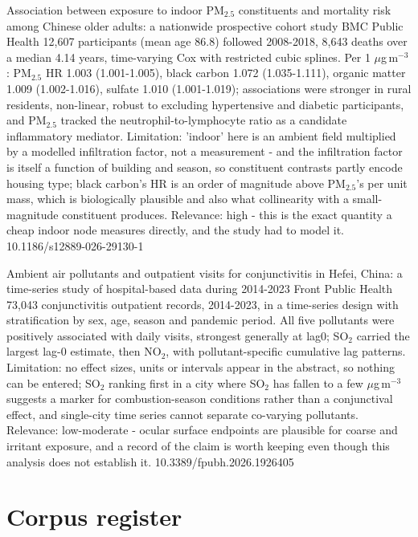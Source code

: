 \documentclass[10pt]{article}
\begin{document}
{Association between exposure to indoor PM$_{2.5}$ constituents and mortality risk among Chinese older adults: a nationwide prospective cohort study}
{BMC Public Health}
{12,607 participants (mean age 86.8) followed 2008-2018, 8,643 deaths over a median 4.14 years, time-varying Cox with restricted cubic splines. Per 1 $\mu$g\,m$^{-3}$: PM$_{2.5}$ HR 1.003 (1.001-1.005), black carbon 1.072 (1.035-1.111), organic matter 1.009 (1.002-1.016), sulfate 1.010 (1.001-1.019); associations were stronger in rural residents, non-linear, robust to excluding hypertensive and diabetic participants, and PM$_{2.5}$ tracked the neutrophil-to-lymphocyte ratio as a candidate inflammatory mediator. Limitation: 'indoor' here is an ambient field multiplied by a modelled infiltration factor, not a measurement - and the infiltration factor is itself a function of building and season, so constituent contrasts partly encode housing type; black carbon's HR is an order of magnitude above PM$_{2.5}$'s per unit mass, which is biologically plausible and also what collinearity with a small-magnitude constituent produces. Relevance: high - this is the exact quantity a cheap indoor node measures directly, and the study had to model it.}
{10.1186/s12889-026-29130-1}

{Ambient air pollutants and outpatient visits for conjunctivitis in Hefei, China: a time-series study of hospital-based data during 2014-2023}
{Front Public Health}
{73,043 conjunctivitis outpatient records, 2014-2023, in a time-series design with stratification by sex, age, season and pandemic period. All five pollutants were positively associated with daily visits, strongest generally at lag0; SO$_2$ carried the largest lag-0 estimate, then NO$_2$, with pollutant-specific cumulative lag patterns. Limitation: no effect sizes, units or intervals appear in the abstract, so nothing can be entered; SO$_2$ ranking first in a city where SO$_2$ has fallen to a few $\mu$g\,m$^{-3}$ suggests a marker for combustion-season conditions rather than a conjunctival effect, and single-city time series cannot separate co-varying pollutants. Relevance: low-moderate - ocular surface endpoints are plausible for coarse and irritant exposure, and a record of the claim is worth keeping even though this analysis does not establish it.}
{10.3389/fpubh.2026.1926405}

\clearpage
\section*{\sffamily\bfseries\color{Deep}Corpus register}
\vspace{-1.5mm}{\color{Amber}\rule{\linewidth}{1.1pt}}\vspace{2.5mm}
\end{document}
